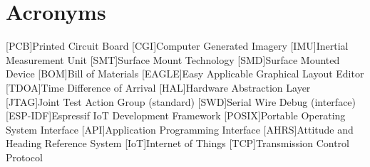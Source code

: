 \chapter{Acronyms}

\begin{acronym}

[PCB]{Printed Circuit Board}
[CGI]{Computer Generated Imagery}
[IMU]{Inertial Measurement Unit}
[SMT]{Surface Mount Technology}
[SMD]{Surface Mounted Device}
[BOM]{Bill of Materials}
[EAGLE]{Easy Applicable Graphical Layout Editor}
[TDOA]{Time Difference of Arrival}
[HAL]{Hardware Abstraction Layer}
[JTAG]{Joint Test Action Group (standard)}
[SWD]{Serial Wire Debug (interface)}
[ESP-IDF]{Espressif IoT Development Framework}
[POSIX]{Portable Operating System Interface}
[API]{Application Programming Interface}
[AHRS]{Attitude and Heading Reference System}
[IoT]{Internet of Things}
[TCP]{Transmission Control Protocol}

\end{acronym}
